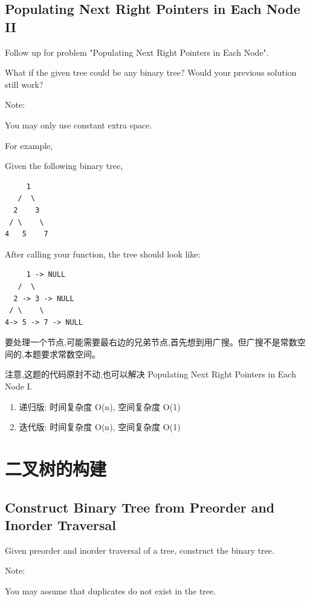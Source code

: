 \documentclass[12pt]{book}
\begin{document}
\subsection{Populating Next Right Pointers in Each Node II}
\label{sec-4-2-12}
Follow up for problem "Populating Next Right Pointers in Each Node".

What if the given tree could be any binary tree? Would your previous solution still work?

Note:

You may only use constant extra space.

For example,

Given the following binary tree,
\lstset{language=java,label= ,caption= ,numbers=none}
\begin{lstlisting}
     1
   /  \
  2    3
 / \    \
4   5    7
\end{lstlisting}

After calling your function, the tree should look like:
\lstset{language=java,label= ,caption= ,numbers=none}
\begin{lstlisting}
     1 -> NULL
   /  \
  2 -> 3 -> NULL
 / \    \
4-> 5 -> 7 -> NULL
\end{lstlisting}

要处理一个节点,可能需要最右边的兄弟节点,首先想到用广搜。但广搜不是常数空间的,本题要求常数空间。

注意,这题的代码原封不动,也可以解决 Populating Next Right Pointers in Each Node I.
\begin{enumerate}
\item 递归版: 时间复杂度 O(n), 空间复杂度 O(1)
\label{sec-4-2-12-1}
\item 迭代版: 时间复杂度 O(n), 空间复杂度 O(1)
\label{sec-4-2-12-2}
\end{enumerate}



\section{二叉树的构建}
\label{sec-4-3}
\subsection{Construct Binary Tree from Preorder and Inorder Traversal}
\label{sec-4-3-1}
Given preorder and inorder traversal of a tree, construct the binary tree.

Note:

You may assume that duplicates do not exist in the tree.
\end{document}
